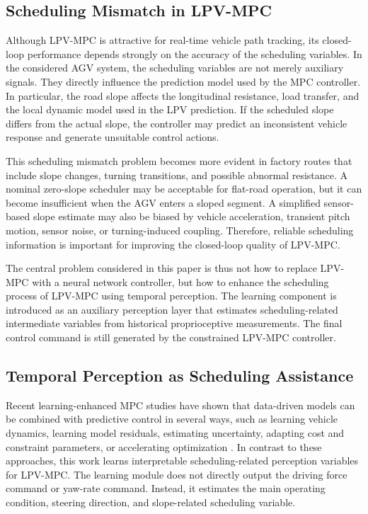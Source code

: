 \documentclass{ieeeaccess}
\newcommand{\citep}[1]{\cite{#1}}
\begin{document}
\subsection{Scheduling Mismatch in LPV-MPC}



Although LPV-MPC is attractive for real-time vehicle path tracking, its closed-loop performance depends strongly on the accuracy of the scheduling variables. In the considered AGV system, the scheduling variables are not merely auxiliary signals. They directly influence the prediction model used by the MPC controller. In particular, the road slope affects the longitudinal resistance, load transfer, and the local dynamic model used in the LPV prediction. If the scheduled slope differs from the actual slope, the controller may predict an inconsistent vehicle response and generate unsuitable control actions.



This scheduling mismatch problem becomes more evident in factory routes that include slope changes, turning transitions, and possible abnormal resistance. A nominal zero-slope scheduler may be acceptable for flat-road operation, but it can become insufficient when the AGV enters a sloped segment. A simplified sensor-based slope estimate may also be biased by vehicle acceleration, transient pitch motion, sensor noise, or turning-induced coupling. Therefore, reliable scheduling information is important for improving the closed-loop quality of LPV-MPC.



The central problem considered in this paper is thus not how to replace LPV-MPC with a neural network controller, but how to enhance the scheduling process of LPV-MPC using temporal perception. The learning component is introduced as an auxiliary perception layer that estimates scheduling-related intermediate variables from historical proprioceptive measurements. The final control command is still generated by the constrained LPV-MPC controller.



\subsection{Temporal Perception as Scheduling Assistance}



Recent learning-enhanced MPC studies have shown that data-driven models can be combined with predictive control in several ways, such as learning vehicle dynamics, learning model residuals, estimating uncertainty, adapting cost and constraint parameters, or accelerating optimization \citep{}. In contrast to these approaches, this work learns interpretable scheduling-related perception variables for LPV-MPC. The learning module does not directly output the driving force command or yaw-rate command. Instead, it estimates the main operating condition, steering direction, and slope-related scheduling variable.
\end{document}
